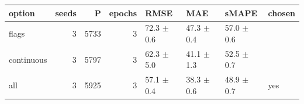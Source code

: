 \begin{tabular}{lrrrllll}
\toprule
option & seeds & P & epochs & RMSE & MAE & sMAPE & chosen \\
\midrule
flags & 3 & 5733 & 3 & 72.3 $\pm$ 0.6 & 47.3 $\pm$ 0.4 & 57.0 $\pm$ 0.6 &  \\
continuous & 3 & 5797 & 3 & 62.3 $\pm$ 5.0 & 41.1 $\pm$ 1.3 & 52.5 $\pm$ 0.7 &  \\
all & 3 & 5925 & 3 & 57.1 $\pm$ 0.4 & 38.3 $\pm$ 0.6 & 48.9 $\pm$ 0.7 & yes \\
\bottomrule
\end{tabular}
